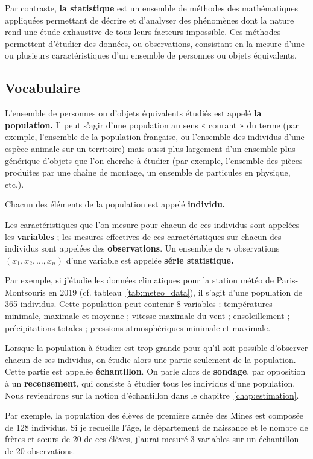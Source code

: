 Par contraste, \textbf{la statistique} est un ensemble de méthodes des
mathématiques appliquées permettant de décrire et d'analyser des phénomènes
dont la nature rend une étude exhaustive de tous leurs facteurs impossible. Ces
méthodes permettent d'étudier des données, ou observations, consistant en la
mesure d'une ou plusieurs caractéristiques d'un ensemble de personnes ou objets
équivalents.

\subsection{Vocabulaire}

L'ensemble de personnes ou d'objets équivalents étudiés est appelé \textbf{la
	population.} Il peut s'agir d'une population au sens « courant » du terme
(par exemple, l'ensemble de la population française, ou l'ensemble des
individus d'une espèce animale sur un territoire) mais aussi plus largement
d'un ensemble plus générique d'objets que l'on cherche à étudier (par exemple,
l'ensemble des pièces produites par une chaîne de montage, un ensemble de
particules en physique, etc.).

Chacun des éléments de la population est appelé \textbf{individu.} 

Les caractéristiques que l'on mesure pour chacun de ces individus sont appelées
les \textbf{variables} ; les mesures effectives de ces caractéristiques sur chacun des individus sont appelées des \textbf{observations}. Un ensemble de $n$
observations $(x_1, x_2, \dots, x_n)$ d'une variable est appelée \textbf{série
	statistique.}

Par exemple, si j'étudie les données climatiques pour la station météo de
Paris-Montsouris en 2019 (cf. tableau~\ref{tab:meteo_data}), il s'agit d'une
population de 365 individus. Cette population peut contenir 8 variables :
températures minimale, maximale et moyenne ; vitesse maximale du vent ;
ensoleillement ; précipitations totales ; pressions atmosphériques minimale et
maximale.


Lorsque la population à étudier est trop grande pour qu'il soit possible
d'observer chacun de ses individus, on étudie alors une partie seulement de la
population. Cette partie est appelée \textbf{échantillon}. On parle alors de
\textbf{sondage}, par opposition à un \textbf{recensement}, qui consiste à
étudier tous les individus d'une population. Nous reviendrons sur la notion
d'échantillon dans le chapitre~\ref{chap:estimation}.

Par exemple, la population des élèves de première année des Mines est
composée de 128 individus. Si je recueille l'âge, le département de naissance
et le nombre de frères et s\oe{}urs de 20 de ces élèves, j'aurai mesuré 3 variables
sur un échantillon de 20 observations. 

